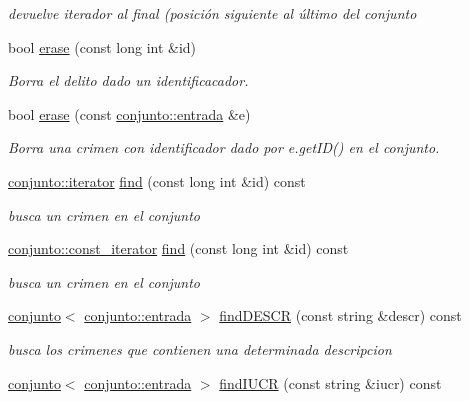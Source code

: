 \begin{DoxyCompactItemize}
\begin{DoxyCompactList}\small\item\em devuelve iterador al final (posición siguiente al último del conjunto \end{DoxyCompactList}\item 
bool \hyperlink{classconjunto_ad550177fa4454da3a10fa356417e39a7}{erase} (const long int \&id)
\begin{DoxyCompactList}\small\item\em Borra el delito dado un identificacador. \end{DoxyCompactList}\item 
bool \hyperlink{classconjunto_a77a21ed91f1002f4eaed48d86535a874}{erase} (const \hyperlink{classconjunto_a09cad766dd65de73e51eae21f9d22585}{conjunto\+::entrada} \&e)
\begin{DoxyCompactList}\small\item\em Borra una crimen con identificador dado por e.\+get\+I\+D() en el conjunto. \end{DoxyCompactList}\item 
\hyperlink{classconjunto_1_1iterator}{conjunto\+::iterator} \hyperlink{classconjunto_a2459d07b15a25a474f1be8dc0038feb5}{find} (const long int \&id) const 
\begin{DoxyCompactList}\small\item\em busca un crimen en el conjunto \end{DoxyCompactList}\item 
\hyperlink{classconjunto_1_1const__iterator}{conjunto\+::const\+\_\+iterator} \hyperlink{classconjunto_a356285fe75238fd67673eba9c6bf6d24}{find} (const long int \&id) const 
\begin{DoxyCompactList}\small\item\em busca un crimen en el conjunto \end{DoxyCompactList}\item 
\hyperlink{classconjunto}{conjunto}$<$ \hyperlink{classconjunto_a09cad766dd65de73e51eae21f9d22585}{conjunto\+::entrada} $>$ \hyperlink{classconjunto_a5190c59db573008cc48a8ce734954a96}{find\+D\+E\+S\+C\+R} (const string \&descr) const 
\begin{DoxyCompactList}\small\item\em busca los crimenes que contienen una determinada descripcion \end{DoxyCompactList}\item 
\hyperlink{classconjunto}{conjunto}$<$ \hyperlink{classconjunto_a09cad766dd65de73e51eae21f9d22585}{conjunto\+::entrada} $>$ \hyperlink{classconjunto_a50eb93f152dc973726d184733d7ecd98}{find\+I\+U\+C\+R} (const string \&iucr) const 

\end{DoxyCompactItemize}
